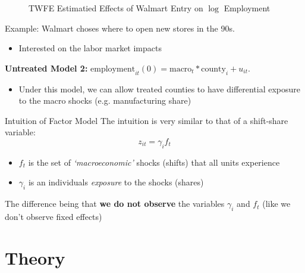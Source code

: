 \documentclass[aspectratio=43,t]{beamer}
\begin{document}
\begin{frame}{}
  \begin{figure}
    \caption{TWFE Estimatied Effects of Walmart Entry on $\log$ Employment}

    
  \end{figure}
\end{frame}

\begin{frame}{Example:}
  Walmart choses where to open new stores in the 90s.
  \begin{itemize}
    \item Interested on the labor market impacts
  \end{itemize}

  \bigskip
  \textbf{Untreated Model 2:} $\text{employment}_{it}(0) = \text{macro}_t * \text{county}_i + u_{it}$.
  \begin{itemize}
    \item Under this model, we can allow treated counties to have differential exposure to the macro shocks (e.g. manufacturing share)
  \end{itemize}
\end{frame}

\begin{frame}{Intuition of Factor Model}
  The intuition is very similar to that of a shift-share variable:
  $$
    z_{it} = \gamma_i f_t
  $$
  \vspace*{-5mm}
  \begin{itemize}
    \item $f_t$ is the set of \emph{`macroeconomic'} shocks (shifts) that all units experience
    \item $\gamma_i$ is an individuals \emph{exposure} to the shocks (shares)
  \end{itemize}

  \bigskip
  The difference being that \textbf{we do not observe} the variables $\gamma_i$ and $f_t$ (like we don't observe fixed effects)
\end{frame}

\section{Theory}
\end{document}
